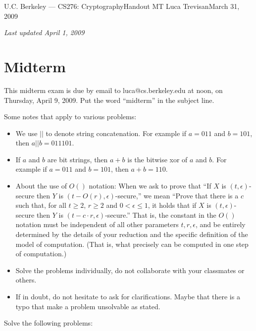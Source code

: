 \documentclass[12pt]{article}
\def\em{\it}
\def\em{\it}
\def\courseprof{Luca Trevisan}
\def\coursenum{CS276}
\def\coursename{Cryptography}
\newlength{\tpush}
\newcommand{\problemset}[2]{\noindent\vspace*{-\tpush}\newline\parbox{\textwidth}
{U.C. Berkeley --- \coursenum : \coursename \hfill Handout #1 \newline
\courseprof \hfill #2 \newline
\mbox{}\hrulefill\mbox{}}\vspace*{1ex}\mbox{}\newline
\bigskip
\bigskip}
\begin{document}
\problemset{MT}{March 31, 2009}

{\em Last updated April 1, 2009}

\section*{Midterm}

\bigskip

This midterm exam is due by email to {\sf luca@cs.berkeley.edu}
at noon, on Thursday, April 9, 2009. Put the word ``midterm'' in
the subject line.

Some notes that apply to various problems:
\begin{itemize}
\item We use $||$ to denote string concatenation. For
example if $a= 011$ and $b= 101$, then $a||b = 011101$.
\item If $a$ and $b$ are bit strings, then $a+b$ is the bitwise xor
of $a$ and $b$. For example if $a=011$ and $b=101$, then
$a+b = 110$.
\item About the use of $O()$ notation:
When we ask to prove that ``If $X$ is $(t,\epsilon)$-secure
then $Y$ is $(t-O(r),\epsilon)$-secure,'' we mean ``Prove that
there is a $c$ such that, for all $t\geq 2$, $r\geq 2$ and $0<\epsilon \leq 1$,
it holds that if $X$ is $(t,\epsilon)$-secure then $Y$ is $(t-c\cdot r,\epsilon)$-secure.''
That is, the constant in the $O()$ notation must be independent of all
other parameters $t,r,\epsilon$, and be entirely determined by the
details of your reduction and the specific definition of the model of
computation. (That is, what precisely can be computed in one step of computation.)

\item Solve the problems individually, do not collaborate with your
classmates or others.

\item If in doubt, do not hesitate to ask for clarifications.
Maybe  that there is a typo that make a problem
unsolvable as stated.

\end{itemize}

Solve the following problems:
\end{document}
